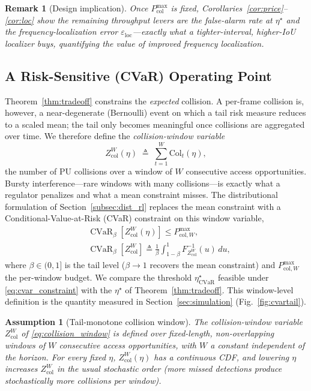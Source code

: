 \documentclass[journal]{IEEEtran}
\newtheorem{assumption}{Assumption}
\newtheorem{remark}{Remark}
\newcommand{\defeq}{\triangleq}
\newcommand{\thr}{\eta}                    %
\newcommand{\Pcolmax}{P_{\mathrm{col}}^{\max}} %
\newcommand{\Zcol}{Z_{\mathrm{col}}}        %
\DeclareMathOperator{\CVaR}{CVaR}
\newcommand{\cvarcol}{\beta}                %
\newcommand{\thrcvar}{\thr^{\star}_{\mathrm{CVaR}}} %
\newcommand{\Qinv}{F^{-1}}                   %
\newcommand{\PcolmaxW}{P_{\mathrm{col},W}^{\max}}  %
\newcommand{\eloc}{\varepsilon_{\mathrm{loc}}}
\begin{document}
\begin{remark}[Design implication]
Once $\Pcolmax$ is fixed, Corollaries~\ref{cor:price}--\ref{cor:loc} show the
remaining throughput levers are the false-alarm rate at $\thr^{\star}$ and the
frequency-localization error $\eloc$---exactly what a tighter-interval,
higher-IoU localizer buys, quantifying the value of improved frequency
localization.
\end{remark}

\subsection{A Risk-Sensitive (CVaR) Operating Point}
\label{subsec:thmD}
Theorem~\ref{thm:tradeoff} constrains the \emph{expected} collision. A
per-frame collision is, however, a near-degenerate (Bernoulli) event on which
a tail risk measure reduces to a scaled mean; the tail only becomes
meaningful once collisions are aggregated over time. We therefore define the
\emph{collision-window variable}
\begin{equation}
\Zcol^{W}(\thr)\;\defeq\;\sum_{t=1}^{W}\mathrm{Col}_t(\thr),
\label{eq:collision_window}
\end{equation}
the number of PU collisions over a window of $W$ consecutive access
opportunities. Bursty interference---rare windows with many collisions---is
exactly what a regulator penalizes and what a mean constraint misses. The
distributional formulation of Section~\ref{subsec:dist_rl} replaces the mean
constraint with a Conditional-Value-at-Risk (CVaR) constraint on this window
variable,
\begin{equation}
\begin{aligned}
&\CVaR_{\cvarcol}\!\left[\Zcol^{W}(\thr)\right]\le\PcolmaxW,\\
&\CVaR_{\cvarcol}[\Zcol^{W}]\defeq\frac{1}{\cvarcol}\!\int_{1-\cvarcol}^{1}\!\!
\Qinv_{\Zcol^{W}}(u)\,du,
\end{aligned}
\label{eq:cvar_constraint}
\end{equation}
where $\cvarcol\in(0,1]$ is the tail level ($\cvarcol\to1$ recovers the mean
constraint) and $\PcolmaxW$ the per-window budget. We compare the threshold
$\thrcvar$ feasible under \eqref{eq:cvar_constraint} with the $\thr^{\star}$
of Theorem~\ref{thm:tradeoff}. This window-level definition is the quantity
measured in Section~\ref{sec:simulation} (Fig.~\ref{fig:cvartail}).

\begin{assumption}[Tail-monotone collision window]
\label{as:tailmono}
The collision-window variable $\Zcol^{W}$ of \eqref{eq:collision_window} is
defined over \emph{fixed-length, non-overlapping} windows of $W$ consecutive
access opportunities, with $W$ a constant independent of the horizon. For
every fixed $\thr$, $\Zcol^{W}(\thr)$ has a continuous CDF, and lowering
$\thr$ increases $\Zcol^{W}$ in the usual stochastic order (more missed
detections produce stochastically more collisions per window).
\end{assumption}
\end{document}
